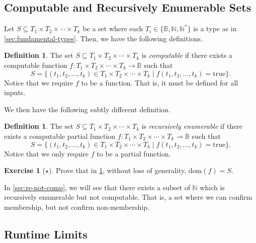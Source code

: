 \documentclass[11pt,a4paper,reqno]{amsart}
\theoremstyle{plain}
\theoremstyle{definition}
\newtheorem{definition}[theorem]{Definition}
\theoremstyle{definition}
\newtheorem{exercise}[theorem]{Exercise}
\newcommand\exerciseLevelEasy{$\star$}
\begin{document}
\subsection{Computable and Recursively Enumerable Sets}\label{sec:re-sets}

Let $S \subseteq T_1\times T_2\times\cdots \times T_k$ be a set where each $T_i \in \{\mathbb B, \mathbb N, \mathbb N^*\}$ is a type as in \cref{sec:fundamental-types}.
Then, we have the following definitions.

\begin{definition}
  The set $S \subseteq T_1\times T_2\times\cdots \times T_k$ is \emph{computable} if there exists a computable function $f\colon T_1\times T_2\times\cdots \times T_k \to\mathbb B$ such that
  \[
    S = \{ (t_1,t_2,\ldots,t_k)\in T_1\times T_2\times\cdots \times T_k \mid f(t_1,t_2,\ldots,t_k)=\mathrm{true} \}.
  \]
  Notice that we require $f$ to be a function. That is, it must be defined for all inputs.
\end{definition}

We then have the following subtly different definition.

\begin{definition}\label{def:re-set}
  The set $S \subseteq T_1\times T_2\times\cdots \times T_k$ is \emph{recursively enumerable} if there exists a computable partial function $f\colon T_1\times T_2\times\cdots \times T_k \rightharpoonup\mathbb B$ such that
  \[
    S = \{ (t_1,t_2,\ldots,t_k)\in T_1\times T_2\times\cdots \times T_k \mid f(t_1,t_2,\ldots,t_k)=\mathrm{true} \}.
  \]
  Notice that we only require $f$ to be a partial function.
\end{definition}

\begin{exercise}[\exerciseLevelEasy]
  Prove that in \cref{def:re-set}, without loss of generality, $\mathrm{dom}(f) = S$. 
\end{exercise}

In \cref{sec:re-not-comp}, we will see that there exists a subset of $\mathbb N$ which is recursively enumerable but not computable.
That is, a set where we can confirm membership, but not confirm non-membership.

\subsection{Runtime Limits}\label{sec:runtime-limit}
\end{document}

